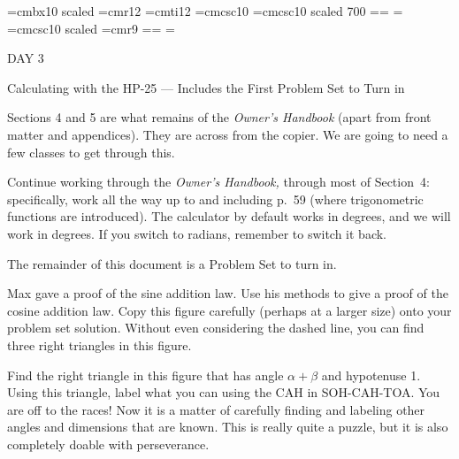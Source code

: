 
\def\folio{\ifnum\pageno>0 \number\pageno \else
   \ifnum\pageno<0 \romannumeral-\pageno \else\fi\fi}

\font\largebf=cmbx10  scaled 
\font\largerm=cmr12
\font\largeit=cmti12
\font\tensc=cmcsc10
\font\sevensc=cmcsc10 scaled 700
\newfam\scfam \def\sc{\fam\scfam\tensc}
\textfont\scfam=\tensc \scriptfont\scfam=\sevensc
\scriptscriptfont\scfam=\sevensc
\font\largesc=cmcsc10 scaled 
\font\ninerm=cmr9
\newfam\srfam \def\sr{\fam\srfam\ninerm}
\textfont\srfam=\ninerm \scriptfont\srfam=\sevenrm
\scriptscriptfont\srfam=\fiverm




\null\vskip36pt

\centerline{\largerm DAY 3}
\nobreak\bigskip

\centerline{\largeit Calculating with the HP-25 --- Includes the First Problem Set to Turn in}
\nobreak\bigskip

\nobreak\bigskip

\noindent Sections 4 and 5 are what remains of the {\it Owner's Handbook} (apart from front matter and appendices). They are across from the copier. We are going to need a few classes to get through this.

Continue working through the {\it Owner's Handbook,} through most of Section~4: specifically, work all the way up to and including p.~59 (where trigonometric functions are introduced). The calculator
by default works in degrees, and we will work in degrees. If you switch to radians, remember to switch it back.

The remainder of this document is a Problem Set to turn in.

\bigskip

\nobreak\bigskip

\noindent Max gave a proof of the sine addition law. Use his methods to give a proof of the cosine addition law. Copy this figure carefully (perhaps at a larger size) onto your problem set solution.
Without even considering the dashed line, you can find three right triangles in this figure.

\midinsert
\centerline{}
\endinsert
\nobreak\bigskip


\noindent Find the right triangle in this figure that has angle $\alpha + \beta$ and hypotenuse 1. Using this triangle, label what you can using the CAH in SOH-CAH-TOA. You are off to the races! Now it is a matter of
carefully finding and labeling other angles and dimensions that are known. This is really quite a puzzle, but it is also completely doable with perseverance.

